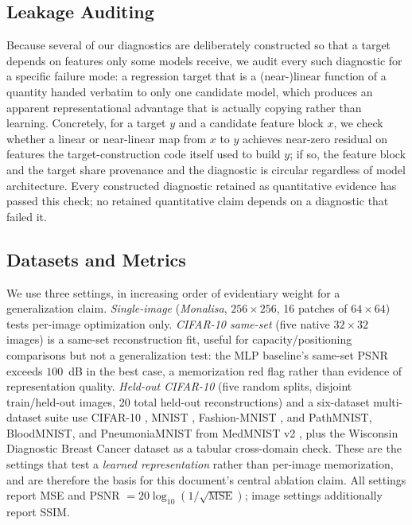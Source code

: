 \documentclass[11pt]{article}
\begin{document}
\subsection{Leakage Auditing}
Because several of our diagnostics are deliberately constructed so that a target depends on features only some models receive, we audit every such diagnostic for a specific failure mode: a regression target that is a (near-)linear function of a quantity handed verbatim to only one candidate model, which produces an apparent representational advantage that is actually copying rather than learning. Concretely, for a target $y$ and a candidate feature block $x$, we check whether a linear or near-linear map from $x$ to $y$ achieves near-zero residual on features the target-construction code itself used to build $y$; if so, the feature block and the target share provenance and the diagnostic is circular regardless of model architecture. Every constructed diagnostic retained as quantitative evidence has passed this check; no retained quantitative claim depends on a diagnostic that failed it.

\subsection{Datasets and Metrics}
We use three settings, in increasing order of evidentiary weight for a generalization claim. \textit{Single-image} (\textit{Monalisa}, $256\times256$, 16 patches of $64\times64$) tests per-image optimization only. \textit{CIFAR-10 same-set} (five native $32\times32$ images) is a same-set reconstruction fit, useful for capacity/positioning comparisons but not a generalization test: the MLP baseline's same-set PSNR exceeds $100$~dB in the best case, a memorization red flag rather than evidence of representation quality. \textit{Held-out CIFAR-10} (five random splits, disjoint train/held-out images, 20 total held-out reconstructions) and a six-dataset multi-dataset suite use CIFAR-10 \cite{Krizhevsky2009}, MNIST \cite{LeCun1998}, Fashion-MNIST \cite{Xiao2017}, and PathMNIST, BloodMNIST, and PneumoniaMNIST from MedMNIST v2 \cite{Yang2023}, plus the Wisconsin Diagnostic Breast Cancer dataset \cite{Wolberg1993} as a tabular cross-domain check. These are the settings that test a \emph{learned representation} rather than per-image memorization, and are therefore the basis for this document's central ablation claim. All settings report MSE and PSNR $=20\log_{10}(1/\sqrt{\mathrm{MSE}})$; image settings additionally report SSIM.
\end{document}
